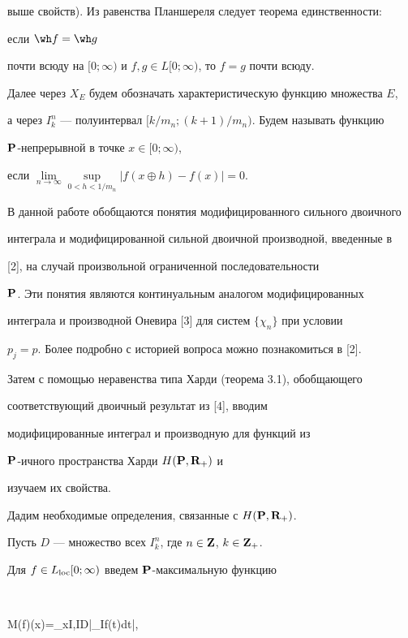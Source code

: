 выше свойств). Из равенства Планшереля следует теорема единственности:


если ${\wh f}={\wh g}$ 


почти всюду на $[0;\infty)$ и $f,g\in L[0;\infty)$, то $f=g$ почти всюду.





Далее через $X_E$ будем обозначать характеристическую функцию множества $E$,


а через  $I_k^n$ --- полуинтервал $[k/m_n;(k+1)/m_n)$. Будем называть функцию 


${\bold P}$-непрерывной в точке $x\in [0;\infty)$,


если $\lim \limits_{n\to\infty}


\sup \limits_{0<h<1/m_n}|f(x\oplus h)-f(x)|=0$.





В данной работе обобщаются понятия модифицированного сильного двоичного 


интеграла и модифицированной сильной двоичной производной, введенные в 


[2], на случай произвольной ограниченной последовательности


${\bold P}$. Эти понятия являются континуальным аналогом модифицированных


интеграла и производной Оневира [3] для систем $\{\chi_n\}$ при условии


$p_j=p$. Более подробно с историей вопроса можно познакомиться в [2].


Затем с помощью неравенства типа Харди (теорема 3.1), обобщающего 


соответствующий двоичный результат из [4], вводим 


модифицированные интеграл и производную для функций из 


${\bold P}$-ичного пространства Харди $H({\bold P},{\bold R}_+)$ и


изучаем их свойства.


Дадим необходимые определения, связанные с $H({\bold P},{\bold R}_+)$.





Пусть $D$ --- множество всех $I^n_k$, где $n\in {\bold Z}$, $k\in {\bold Z}_+$. 


Для $f\in L_{\operatorname{loc}}[0;\infty)$ введем ${\bold P}$-максимальную функцию


$$


M(f)(x)=\sup_{x\in I,I\in D}\bigg|\int_If(t)dt\bigg|,


